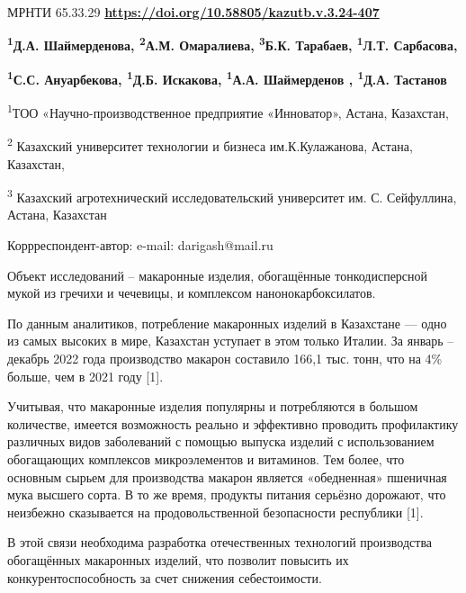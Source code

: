 \newpage
МРНТИ 65.33.29
\hfill {\bfseries \href{https://doi.org/10.58805/kazutb.v.3.24-407}{https://doi.org/10.58805/kazutb.v.3.24-407}}

\begin{center}

{\bfseries \textsuperscript{1}Д.А. Шаймерденова\envelope,
\textsuperscript{2}А.М. Омаралиева, \textsuperscript{3}Б.К. Тарабаев,
\textsuperscript{1}Л.Т. Сарбасова,}

{\bfseries \textsuperscript{1}С.С. Ануарбекова, \textsuperscript{1}Д.Б.
Искакова, \textsuperscript{1}А.А. Шаймерденов , \textsuperscript{1}Д.А.
Тастанов}

\textsuperscript{1}ТОО «Научно-производственное предприятие «Инноватор»,
Астана, Казахстан,

\textsuperscript{2} Казахский университет технологии и бизнеса
им.К.Кулажанова, Астана, Казахстан,

\textsuperscript{3} Казахский агротехнический исследовательский
университет им. С. Сейфуллина, Астана, Казахстан
\end{center}
\envelope Коррреспондент-автор: e-mail: darigash@mail.ru\vspace{0.5cm}

Объект исследований -- макаронные изделия, обогащённые тонкодисперсной
мукой из гречихи и чечевицы, и комплексом нанонокарбоксилатов.

По данным аналитиков, потребление макаронных изделий в Казахстане ---
одно из самых высоких в мире, Казахстан уступает в этом только Италии.
За январь -- декабрь 2022 года производство макарон составило 166,1 тыс.
тонн, что на 4\% больше, чем в 2021 году {[}1{]}.

Учитывая, что макаронные изделия популярны и потребляются в большом
количестве, имеется возможность реально и эффективно проводить
профилактику различных видов заболеваний с помощью выпуска изделий с
использованием обогащающих комплексов микроэлементов и витаминов. Тем
более, что основным сырьем для производства макарон является
«обедненная» пшеничная мука высшего сорта. В то же время, продукты
питания серьёзно дорожают, что неизбежно сказывается на
продовольственной безопасности республики {[}1{]}.

В этой связи необходима разработка отечественных технологий производства
обогащённых макаронных изделий, что позволит повысить их
конкурентоспособность за счет снижения себестоимости.

